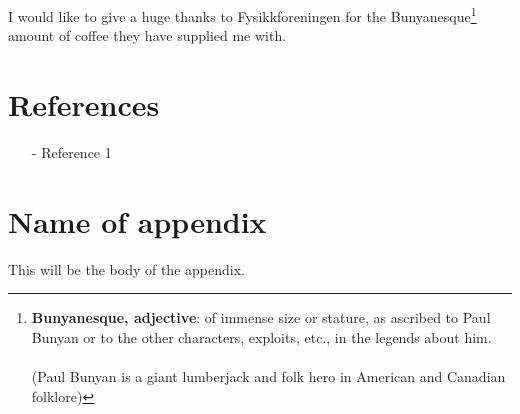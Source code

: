 \documentclass[reprint,english,notitlepage,nofootinbib]{revtex4-1}  %
\numberwithin{equation}{section}
\begin{document}
\begin{acknowledgments}  %
I would like to give a huge thanks to Fysikkforeningen for the
Bunyanesque\footnote{\textbf{Bunyanesque, adjective}: of immense size or stature, as ascribed to Paul Bunyan or to the other characters, exploits, etc., in the legends about him. \\ \\
(Paul Bunyan is a giant lumberjack and folk hero in American and Canadian folklore) } amount of coffee they have supplied me with.
\end{acknowledgments}


\section*{References}  %
\begin{itemize}
\item[-]Reference 1
\end{itemize}

\newpage
\appendix
\section{Name of appendix}
This will be the body of the appendix.



\end{document}
